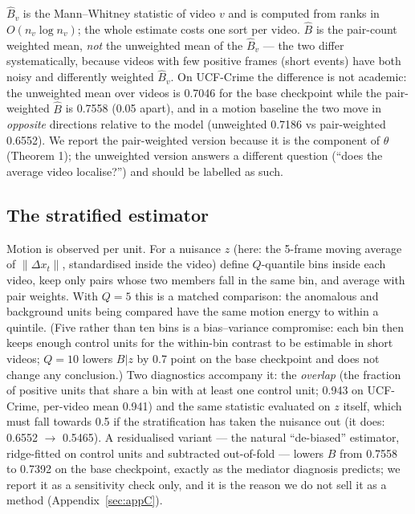 \documentclass[number,preprint,12pt]{elsarticle}
\begin{document}
\(\hat{B}_v\) is the Mann--Whitney statistic \citep{mann1947test} of video \(v\) and is computed from ranks in
\(O(n_v\log n_v)\); the whole estimate costs one sort per video. \(\hat{B}\) is the
pair-count weighted mean, \emph{not} the unweighted mean of the \(\hat{B}_v\) --- the two
differ systematically, because videos with few positive frames (short events)
have both noisy and differently weighted \(\hat{B}_v\). On UCF-Crime the difference is
not academic: the unweighted mean over videos is 0.7046 for the base checkpoint
while the pair-weighted \(\hat{B}\) is 0.7558 (0.05 apart), and in a motion baseline the
two move in \emph{opposite} directions relative to the model (unweighted 0.7186 vs
pair-weighted 0.6552). We report the pair-weighted version because it is the
component of \(\theta\) (Theorem 1); the unweighted version answers a different question
(``does the average video localise?'') and should be labelled as such.

\subsection{The stratified estimator}\label{sec:strat}

Motion is observed per unit. For a nuisance \(z\) (here: the 5-frame moving
average of \(\lVert\Delta x_t\rVert\), standardised inside the video) define \(Q\)-quantile bins
inside each video, keep only pairs whose two members fall in the same bin, and
average with pair weights. With \(Q=5\) this is a matched comparison: the
anomalous and background units being compared have the same motion energy to
within a quintile. (Five rather than ten bins is a bias--variance compromise: each
bin then keeps enough control units for the within-bin contrast to be estimable in
short videos; \(Q=10\) lowers \(B|z\) by 0.7 point on the base checkpoint and does
not change any conclusion.) Two diagnostics accompany it: the \emph{overlap} (the fraction of
positive units that share a bin with at least one control unit; 0.943 on
UCF-Crime, per-video mean 0.941) and the same statistic evaluated on \(z\) itself,
which must fall towards 0.5 if the stratification has taken the nuisance out (it
does: 0.6552 \(\to\) 0.5465). A residualised variant --- the natural ``de-biased''
estimator, ridge-fitted on control units and subtracted out-of-fold --- lowers
\(B\) from 0.7558 to 0.7392 on the base checkpoint, exactly as the mediator
diagnosis predicts; we report it as a sensitivity check only, and it is the
reason we do not sell it as a method (Appendix~\ref{sec:appC}).
\end{document}

